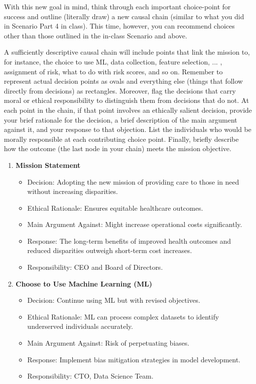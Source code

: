 \documentclass[expanded]{lkx_pset}
\begin{document}
\begin{parts}
	\begin{part}{}
		With this new goal in mind, think through each important choice-point for success and outline (literally draw) a new causal chain (similar to what you did in Scenario Part 4 in class). This time, however, you can recommend choices other than those outlined in the in-class Scenario and above.

		A sufficiently descriptive causal chain will include points that link the mission to, for instance, the choice to use ML, data collection, feature selection, ... , assignment of risk, what to do with risk scores, and so on. Remember to represent actual decision points as ovals and everything else (things that follow directly from decisions) as rectangles. Moreover, flag the decisions that carry moral or ethical responsibility to distinguish them from decisions that do not. At each point in the chain, if that point involves an ethically salient decision, provide your brief rationale for the decision, a brief description of the main argument against it, and your response to that objection. List the individuals who would be morally responsible at each contributing choice point. Finally, briefly describe how the outcome (the last node in your chain) meets the mission objective.
	\end{part}

	\begin{enumerate}
		\item \textbf{Mission Statement}
		      \begin{itemize}
			      \item Decision: Adopting the new mission of providing care to those in need without increasing disparities.
			      \item Ethical Rationale: Ensures equitable healthcare outcomes.
			      \item Main Argument Against: Might increase operational costs significantly.
			      \item Response: The long-term benefits of improved health outcomes and reduced disparities outweigh short-term cost increases.
			      \item Responsibility: CEO and Board of Directors.
		      \end{itemize}

		\item \textbf{Choose to Use Machine Learning (ML)}
		      \begin{itemize}
			      \item Decision: Continue using ML but with revised objectives.
			      \item Ethical Rationale: ML can process complex datasets to identify underserved individuals accurately.
			      \item Main Argument Against: Risk of perpetuating biases.
			      \item Response: Implement bias mitigation strategies in model development.
			      \item Responsibility: CTO, Data Science Team.
		      \end{itemize}


\end{enumerate}
\end{parts}
\end{document}

